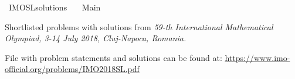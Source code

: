 %
\begin{isabellebody}%
%
%
\isadelimdocument
%
\endisadelimdocument
%
\isatagdocument
%
\isamarkuptrue%
%
\endisatagdocument
{\isafolddocument}%
%
\isadelimdocument
%
\endisadelimdocument
%
\isadelimtheory
%
\endisadelimtheory
%
\isatagtheory
{}\isamarkupfalse%
\ IMO{\isacharunderscore}{}{}{}{}{\isacharunderscore}SL{\isacharunderscore}solutions\isanewline
\ \ \ Main\isanewline
\isanewline
{}%
\endisatagtheory
{\isafoldtheory}%
%
\isadelimtheory
%
\endisadelimtheory
%
\begin{isamarkuptext}%
Shortlisted problems with solutions from \emph{59-th International Mathematical Olympiad, 3-14 July 2018, Cluj-Napoca, Romania.}

File with problem statements and solutions can be found at:
\url{https://www.imo-official.org/problems/IMO2018SL.pdf}%
\end{isamarkuptext}\isamarkuptrue%
%
\isadelimtheory
%
\endisadelimtheory
%
\isatagtheory
{}\isamarkupfalse%
%
\endisatagtheory
{\isafoldtheory}%
%
\isadelimtheory
%
\endisadelimtheory
%
\end{isabellebody}%
\endinput
